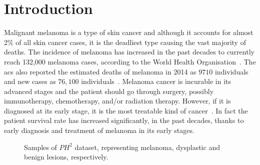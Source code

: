 \graphicspath{ {./content/intro/figures/} }

\section{Introduction}
\label{sec:descr}  %
Malignant melanoma is a type of skin cancer and although it accounts for almost 2\% of all skin cancer cases, it is the deadliest type causing the vast majority of deaths.
The incidence of melanoma has increased in the past decades to currently reach 132,000 melanoma cases, according to the World Health Organisation~\cite{WoH}.
The \Ac{acs} also reported the estimated deaths of melanoma in 2014 as $9710$ individuals and new cases as $76,100$ individuals~\cite{CancerFactsFigures2014}.
Melanoma cancer is incurable in its advanced stages and the patient should go through surgery, possibly immunotherapy, chemotherapy, and/or radiation therapy.
However, if it is diagnosed at its early stage, it is the most treatable kind of cancer~\cite{CancerFactsFigures2014,forsea2012melanoma}.
In fact the patient survival rate has increased significantly, in the past decades, thanks to early diagnosis and treatment of melanoma in its early stages.

\begin{figure}
\begin{center}
  \hspace*{\fill}
  \hfill
  \hfill
  \hspace*{\fill}
  \caption{Samples of $PH^2$ dataset, representing melanoma, dysplastic and benign lesions, respectively.}
  \label{fig:PH2samples}
\end{center}
\end{figure}

